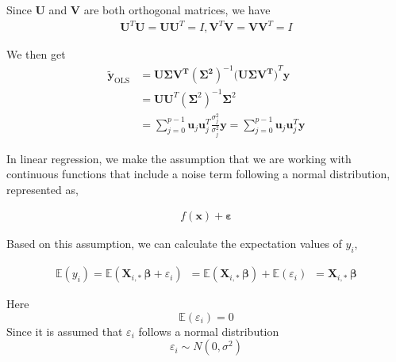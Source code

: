 \documentclass[a4paper,12pt]{article}
\begin{document}
\noindent
Since $\boldsymbol{U}$ and $\boldsymbol{V}$ are both orthogonal matrices, we have
\begin{equation} \label{eq1}
\begin{split}
\boldsymbol{U}^T\boldsymbol{U}=\boldsymbol{U}\boldsymbol{U}^T=I, \boldsymbol{V}^T\boldsymbol{V}=\boldsymbol{V}\boldsymbol{V}^T=I
\end{split}
\end{equation}

\noindent
We then get
\begin{equation} \label{eq1}
\begin{split}
\tilde{\boldsymbol{y}}_{\mathrm{OLS}}&=\boldsymbol{\boldsymbol{U}\boldsymbol{\Sigma}\boldsymbol{V}^T}\left(\boldsymbol{\boldsymbol{\Sigma^2}}\right)^{-1}\boldsymbol{\big(\boldsymbol{U}\boldsymbol{\Sigma}\boldsymbol{V}^T\big)}^T\boldsymbol{y}\\
&=\boldsymbol{U}\boldsymbol{U}^T(\boldsymbol{\Sigma}^2)^{-1}\boldsymbol{\Sigma}^2\\
&=\sum_{j=0}^{p-1}\boldsymbol{u}_j\boldsymbol{u}_j^T\frac{\sigma_j^2}{\sigma_j^2}\boldsymbol{y}=\sum_{j=0}^{p-1}\boldsymbol{u}_j\boldsymbol{u}_j^T\boldsymbol{y}
\end{split}
\end{equation}

\noindent
In linear regression, we make the assumption that we are working with continuous functions that include a noise term following a normal distribution, represented as,


\begin{equation} \label{eq1}
\begin{split}
f(\boldsymbol{x}) + \boldsymbol{\varepsilon}
\end{split}
\end{equation}

\noindent
Based on this assumption, we can calculate the expectation values of $y_i$,

\begin{equation} \label{eq1}
\begin{split}
\mathbb{E}(y_i) =\mathbb{E}(\mathbf{X}_{i, \ast} \, \boldsymbol{\beta} + \varepsilon_i)
\, \, \, =\mathbb{E}(\mathbf{X}_{i, \ast} \, \boldsymbol{\beta}) + \mathbb{E}(\varepsilon_i)
\, \, \,=\mathbf{X}_{i, \ast} \, \boldsymbol{\beta}
\end{split}
\end{equation}

\noindent
Here  $$\mathbb{E}(\varepsilon_i)=0$$
Since it is assumed that $\varepsilon_i$ follows a normal distribution $$\varepsilon_i \sim N( 0, \sigma^2)$$
\end{document}
